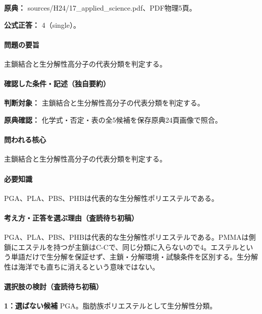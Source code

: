 \noindent\textbf{原典：} sources/H24/17\_applied\_science.pdf、PDF物理5頁。

\textbf{公式正答：} 4（single）。

\paragraph{問題の要旨} 主鎖結合と生分解性高分子の代表分類を判定する。

\paragraph{確認した条件・記述（独自要約）}\mbox{}\par

\noindent\textbf{判断対象：} 主鎖結合と生分解性高分子の代表分類を判定する。\par

\noindent\textbf{原典確認：} 化学式・否定・表の全5候補を保存原典24頁画像で照合。\par

\paragraph{問われる核心} 主鎖結合と生分解性高分子の代表分類を判定する。

\paragraph{必要知識} PGA、PLA、PBS、PHBは代表的な生分解性ポリエステルである。

\paragraph{考え方・正答を選ぶ理由（査読待ち初稿）} PGA、PLA、PBS、PHBは代表的な生分解性ポリエステルである。PMMAは側鎖にエステルを持つが主鎖はC-Cで、同じ分類に入らないので4。エステルという単語だけで生分解を保証せず、主鎖・分解環境・試験条件を区別する。生分解性は海洋でも直ちに消えるという意味ではない。

\paragraph{選択肢の検討（査読待ち初稿）}\mbox{}\par

\noindent\textbf{1：選ばない候補} PGA。脂肪族ポリエステルとして生分解性分類。\par

